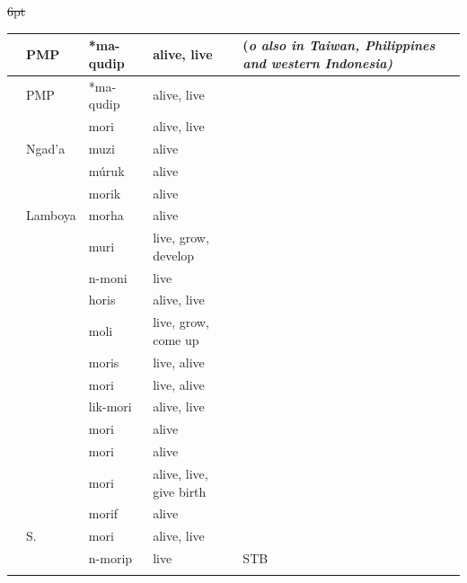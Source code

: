 \newpage
{\st{6pt}\begin{xltabular}[l]{\linewidth}
{>{\hspace{-\tabcolsep}}l<{\hspace{-\tabcolsep}}
>{\hspace{-\tabcolsep}\enspace}lll
>{\raggedright\arraybackslash}X}
\lsptoprule
{}	&	PMP	&	*ma-qudip{\footnotemark}  	&	alive, live 	&	(\it{o} also in Taiwan, Philippines and western Indonesia)		\\	\midrule
\endfirsthead
\lsptoprule
	&	PMP	&	*ma-qudip  	&	alive, live 	&\\	\midrule
\endhead
\rcl	&		&	mori	&	alive, live	&		\\
	&	Ngad'a	&	muzi	&	alive	&		\\
	&		&	múruk	&	alive	&		\\
\rcl	&		&	morik	&	alive	&		\\
\rcl	&	Lamboya	&	morha	&	alive	&		\\
	&		&	muri	&	live, grow, develop	&		\\
\rcl	& 		&	n-moni	&	live	&		\\
\rcl	&		&	horis	&	alive, live	&		\\
\rcl	&		&	moli	&	live, grow, come up	&		\\
\rcl	&		&	moris	&	live, alive	&		\\
\rcl	&		&	mori	&	live, alive	&		\\
\rcl	&		&	lik-mori	&	alive, live	&		\\
\rcl	&		&	mori	&	alive	&		\\
\rcl	&		&	mori	&	alive	&		\\
\rcl	&		&	mori	&	alive, live, give birth	&		\\
\rcl	&		&	morif	&	alive	&		\\
\rcl	&	S. 	&	mori	&	alive, live	&		\\
\rcl	&		&	n-morip	&	live	&	STB	\\
\lspbottomrule
\end{xltabular}\addtocounter{table}{-1}}

